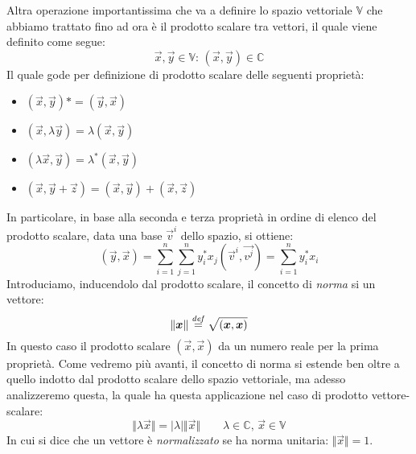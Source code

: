 Altra operazione importantissima che va a definire lo spazio vettoriale $\mathbb{V}$ che abbiamo trattato fino ad ora è il prodotto scalare tra vettori, il quale viene definito come segue:
\begin{equation}
    \vec{x},\vec{y} \in \mathbb{V}: \, (\vec{x},\vec{y}) \in \mathbb{C}
\end{equation}
Il quale gode per definizione di prodotto scalare delle seguenti proprietà:
\begin{itemize}
    \item $(\vec{x},\vec{y})* = (\vec{y},\vec{x})$
    \item $(\vec{x},\lambda \vec{y}) = \lambda(\vec{x},\vec{y})$
    \item $(\lambda\vec{x},\vec{y}) = \lambda^{*}(\vec{x},\vec{y})$
    \item $(\vec{x},\vec{y}+\vec{z}) = (\vec{x},\vec{y}) + (\vec{x},\vec{z})$
\end{itemize}
In particolare, in base alla seconda e terza proprietà in ordine di elenco del prodotto scalare, data una base $\vec{v}^i$ dello spazio, si ottiene:
\begin{equation*}
    (\vec{y},\vec{x}) =
    \sum_{i=1}^{n} \sum_{j=1}^{n} y_{i}^{*}x_j (\vec{v}^i,\vec{v^j}) =
    \sum_{i=1}^{n} y_{i}^{*}x_i
\end{equation*}
Introduciamo, inducendolo dal prodotto scalare, il concetto di \textit{norma} si un vettore:
\begin{equation}
    \Vert \boldsymbol{x} \Vert \overset{\mathit{def}}{=} \sqrt{(\boldsymbol{x},\boldsymbol{x})}
\end{equation}
In questo caso il prodotto scalare $(\vec{x},\vec{x})$ da un numero reale per la prima proprietà. Come vedremo più avanti, il concetto di norma si estende ben oltre a quello indotto dal prodotto scalare dello spazio vettoriale, ma adesso analizzeremo questa, la quale ha questa applicazione nel caso di prodotto vettore-scalare:
\begin{equation*}
    \Vert \lambda\vec{x} \Vert = \vert\lambda\vert \Vert\vec{x}\Vert \qquad
    \lambda\in\mathbb{C}, \, \vec{x}\in\mathbb{V}
\end{equation*}
In cui si dice che un vettore è \textit{normalizzato} se ha norma unitaria: $\Vert\vec{x}\Vert=1$.

